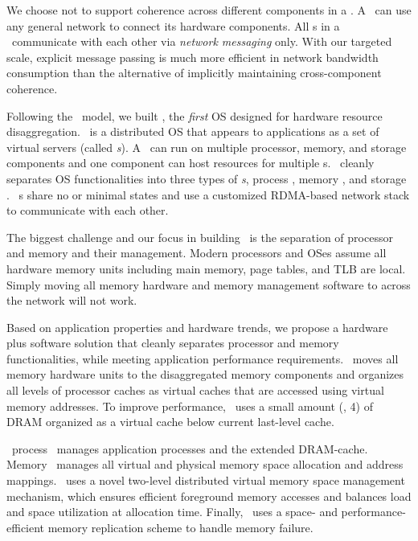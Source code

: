 We choose not to support coherence across different components in a \splitkernel.
A \splitkernel\ can use any general network to connect its hardware components.
All \microos{}s in a \splitkernel\ communicate with each other via {\em network messaging} only.
With our targeted scale, explicit message passing is much more efficient in network bandwidth consumption 
than the alternative of implicitly maintaining cross-component coherence.

Following the \splitkernel\ model, 
we built \lego, the {\em first} OS designed for hardware resource disaggregation.
\lego\ is a distributed OS that appears to applications as a set of virtual servers (called {\em \vnode{}s}).
A \vnode\ can run on multiple processor, memory, and storage components
and one component can host resources for multiple \vnode{}s.
\lego\ cleanly separates OS functionalities into %
three types of {\em \microos{}s},
process \microos, memory \microos, and storage \microos. %
\lego\ \microos{}s share no or minimal states
and use a customized RDMA-based network stack to communicate with each other.

The biggest challenge and our focus in building \lego\ is the separation of processor and memory and their management.
Modern processors and OSes assume all hardware memory units including main memory, page tables, and TLB are local.
Simply moving all memory hardware and memory management software to across the network will not work.

Based on application properties and hardware trends, 
we propose a hardware plus software solution that cleanly separates processor and memory functionalities,
while meeting application performance requirements.
\lego\ moves all memory hardware units to the disaggregated memory components
and organizes all levels of processor caches as virtual caches that are accessed using virtual memory addresses. 
To improve performance, \lego\ uses a small amount (\eg, 4\GB) of DRAM
organized as a virtual cache below current last-level cache.

\lego\ process \microos\ manages application processes and the extended DRAM-cache.
Memory \microos\ manages all virtual and physical memory space allocation and address mappings. 
\lego\ uses a novel two-level distributed virtual memory space management mechanism,
which ensures efficient foreground memory accesses and balances load and space utilization at allocation time.
Finally, \lego\ uses a space- and performance-efficient memory replication scheme to handle memory failure.

